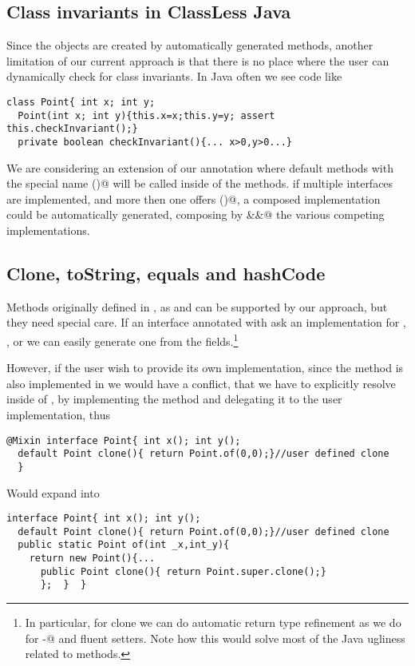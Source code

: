 \subsection{Class invariants in ClassLess Java}
Since the objects are created by automatically generated methods,
another limitation of our current approach is that there is no place where the user can dynamically check for class invariants.
In Java often we see code like
\begin{lstlisting}
class Point{ int x; int y;
  Point(int x; int y){this.x=x;this.y=y; assert this.checkInvariant();}
  private boolean checkInvariant(){... x>0,y>0...}
\end{lstlisting} 

We are considering an extension of our annotation where 
default methods with the special name \Q@checkInvariant()@ will be called inside of the \Q@of@ methods.
if multiple interfaces are implemented, and more then one offers
\Q@checkInvariant()@,  a composed implementation could be automatically generated, composing by \Q@&&@ the various competing implementations.

\subsection{Clone, toString, equals and hashCode}
Methods originally defined in \Q@Object@, as \Q@clone@ and \Q@toString@ can be supported by our approach, but they need special care. If an interface annotated with \mixin ask an implementation for \Q@clone@, \Q@toString@, \Q@equals@ or \Q@hashCode@ we can easily generate one from the fields.\footnote{In particular, for clone we can do automatic return type refinement as we do for \Q@with-@ and fluent setters. Note how this would solve most of the Java ugliness related to \Q@clone@ methods.}

However, if the user wish to provide its own implementation, since the method is also implemented in \Q@Object@ we would have a conflict, that we have to explicitly resolve inside of \Q@of@, by implementing the method and delegating it to the user implementation, thus

\begin{lstlisting}
@Mixin interface Point{ int x(); int y();
  default Point clone(){ return Point.of(0,0);}//user defined clone
  }
\end{lstlisting} 
Would expand into 

\begin{lstlisting}
interface Point{ int x(); int y();
  default Point clone(){ return Point.of(0,0);}//user defined clone
  public static Point of(int _x,int_y){
    return new Point(){...
      public Point clone(){ return Point.super.clone();}
      };  }  }
\end{lstlisting} 
